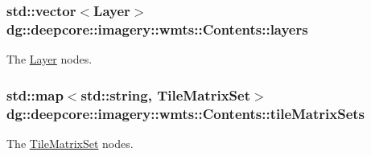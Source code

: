 \subsubsection[{\texorpdfstring{layers}{layers}}]{\setlength{\rightskip}{0pt plus 5cm}std\+::vector$<${\bf Layer}$>$ dg\+::deepcore\+::imagery\+::wmts\+::\+Contents\+::layers}\hypertarget{structdg_1_1deepcore_1_1imagery_1_1wmts_1_1_contents_ac634257db9b4a3bcfd653425212d7eb2}{}\label{structdg_1_1deepcore_1_1imagery_1_1wmts_1_1_contents_ac634257db9b4a3bcfd653425212d7eb2}


The \hyperlink{structdg_1_1deepcore_1_1imagery_1_1wmts_1_1_layer}{Layer} nodes. 

\subsubsection[{\texorpdfstring{tile\+Matrix\+Sets}{tileMatrixSets}}]{\setlength{\rightskip}{0pt plus 5cm}std\+::map$<$std\+::string, {\bf Tile\+Matrix\+Set}$>$ dg\+::deepcore\+::imagery\+::wmts\+::\+Contents\+::tile\+Matrix\+Sets}\hypertarget{structdg_1_1deepcore_1_1imagery_1_1wmts_1_1_contents_afa21421460450c381d86310758710a51}{}\label{structdg_1_1deepcore_1_1imagery_1_1wmts_1_1_contents_afa21421460450c381d86310758710a51}


The \hyperlink{structdg_1_1deepcore_1_1imagery_1_1wmts_1_1_tile_matrix_set}{Tile\+Matrix\+Set} nodes. 

